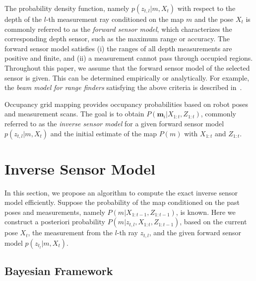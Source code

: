 The probability density function, namely $p(z_{t,l}|m,X_t)$ with respect to the depth of the $l$-th measurement ray conditioned on the map $m$ and the pose $X_t$ is commonly referred to as the \emph{forward sensor model}, which characterizes the corresponding depth sensor, such as the maximum range or accuracy. The forward sensor model satisfies (i) the ranges of all depth measurements are positive and finite, and (ii) a measurement cannot pass through occupied regions. Throughout this paper, we assume that the forward sensor model of the selected sensor is given. This can be determined empirically or analytically. For example, the \emph{beam model for range finders} satisfying  the above criteria is described in~\cite{ThrBurFox05}.

Occupancy grid mapping provides occupancy probabilities based on robot poses and measurement scans. The goal is to obtain $P(\mathbf{m}_i|X_{1:t},Z_{1:t})$, commonly referred to as the \emph{inverse sensor model} for a given forward sensor model $p(z_{t,l}|m,X_t)$ and the initial estimate of the map $P(m)$ with $X_{1:t}$ and $Z_{1:t}$.


\section{Inverse Sensor Model}

In this section, we propose an algorithm to compute the exact inverse sensor model efficiently. 
Suppose the probability of the map conditioned on the past poses and measurements, namely $P(m|X_{1:t-1},Z_{1:t-1})$, is known. Here we construct a posteriori probability $P(m|z_{t,l},X_{1:t},Z_{1:t-1})$, based on the current pose $X_t$, the measurement from the $l$-th ray $z_{t,l}$, and the given forward sensor model $p(z_{t_l}|m,X_t)$.



\subsection{Bayesian Framework}

